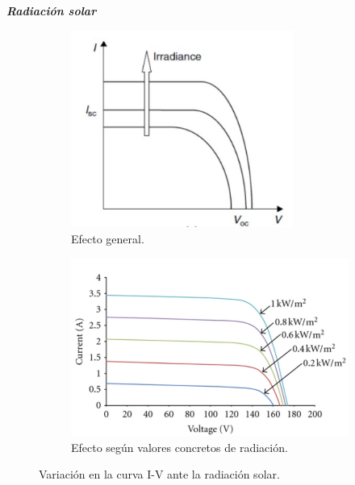 \documentclass[12pt]{article}
\begin{document}
	\noindent \textit{\textbf{Radiación solar}}
	\begin{figure}[h]
		\begin{subfigure}{0.45\textwidth}
			\includegraphics[width=0.8\textwidth]{img/generalEffect_irradianceIVcurve_solarCell.png} 
			\caption{Efecto general.}
			\label{fig: variación general en la curva I-V de una célula PV con la intensidad de la radiación solar.}
		\end{subfigure}
		\begin{subfigure}{0.5\textwidth}
			\includegraphics[width=1.05\linewidth]{img/concreteEffect_irradianceIVcurve_solarCell.png}
			\caption{Efecto según valores concretos de radiación.}
			\label{fig:variación con valores en la curva I-V de una célula PV con la intensidad de la radiación solar.}
		\end{subfigure}
		\caption{Variación en la curva I-V ante la radiación solar.}
		\label{fig:variación I-V radiación solar}
	\end{figure}
	
\end{document}

